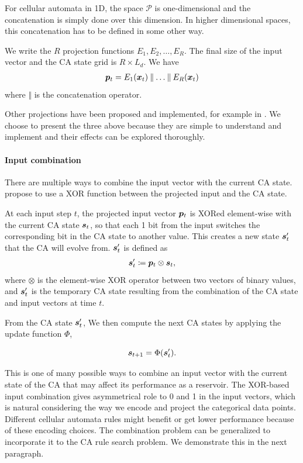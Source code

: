 For cellular automata in 1D, the space $\mathcal{P}$ is one-dimensional and the
concatenation is simply done over this dimension. In higher dimensional spaces,
this concatenation has to be defined in some other way.

We write the $R$ projection functions $E_{1}, E_{2}, \ldots, E_{R}$. The
final size of the input vector and the CA state grid is $R \times L_{d}$. We have
\begin{align}
  {\bm{p}}_{t} = E_{1}({\bm{x}}_{t})\mathbin\Vert \ldots \mathbin \Vert E_{R}({\bm{x}}_{t})
\end{align}
where $\mathbin\Vert$ is the concatenation operator.

Other projections have been proposed and implemented, for example in
\parencite{yilmazReservoirComputingUsing2014}. We choose to present the three
above because they are simple to understand and implement and their effects can
be explored thoroughly.

\paragraph{Input combination}
There are multiple ways to combine the input vector with the current \ac{CA}
state. \textcite{gloverDynamicalLandscapeReservoir2021} propose to use a XOR
function between the projected input and the \ac{CA} state.

At each input step $t$, the projected input vector ${\bm{p}}_{t}$ is XORed
element-wise with the current CA state ${\bm{s}}_{t}$, so that each 1 bit from the
input switches the corresponding bit in the CA state to another value. This
creates a new state ${\bm{s}}_{t}'$ that the CA will evolve from. ${\bm{s}}_{t}'$ is
defined as
\begin{align}
  {\bm{s}}_{t}' \coloneqq {\bm{p}}_{t} \otimes {\bm{s}}_{t},
\end{align}
where $\otimes$ is the element-wise XOR operator between two vectors of binary
values, and ${\bm{s}}'_{t}$ is the temporary CA state resulting from the combination
of the CA state and input vectors at time $t$.

From the \ac{CA} state ${\bm{s}}'_{t}$, We then compute the next CA states by
applying the update function $\Phi$,

\begin{equation}
  \label{eq:ca-state}
  {\bm{s}}_{t + 1} = \Phi({\bm{s}}'_{t}).
\end{equation}

This is one of many possible ways to combine an input vector with the current
state of the CA that may affect its performance as a reservoir. The XOR-based
input combination gives asymmetrical role to 0 and 1 in the input vectors, which
is natural considering the way we encode and project the categorical data
points. Different cellular automata rules might benefit or get lower performance
because of these encoding choices. The combination problem can be generalized to
incorporate it to the \ac{CA} rule search problem. We demonstrate this in the
next paragraph.

